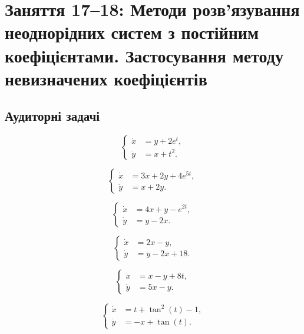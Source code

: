 \section*{Заняття 17--18: Методи розв'язування неоднорідних систем з постійним коефіцієнтами. Застосування методу невизначених коефіцієнтів}

\subsection*{Аудиторні задачі}

\begin{problem}
	\[ \left\{ \begin{aligned} \dot x &= y + 2 e^t, \\ \dot y &= x + t^2. \end{aligned} \right. \]
\end{problem}

\begin{problem}
	\[ \left\{ \begin{aligned} \dot x &= 3 x + 2 y + 4 e^{5 t}, \\ \dot y &= x + 2 y. \end{aligned} \right. \]
\end{problem}

\begin{problem}
	\[ \left\{ \begin{aligned} \dot x &= 4 x + y - e^{2 t}, \\ \dot y &= y - 2 x. \end{aligned} \right. \]
\end{problem}

\begin{problem}
	\[ \left\{ \begin{aligned} \dot x &= 2 x - y, \\ \dot y &= y - 2 x + 18. \end{aligned} \right. \]
\end{problem}

\begin{problem}
	\[ \left\{ \begin{aligned} \dot x &= x - y + 8 t, \\ \dot y &= 5 x - y. \end{aligned} \right. \]
\end{problem}

\begin{problem}
	\[ \left\{ \begin{aligned} \dot x &= t + \tan^2 (t) - 1, \\ \dot y &= - x + \tan (t). \end{aligned} \right. \]
\end{problem}

